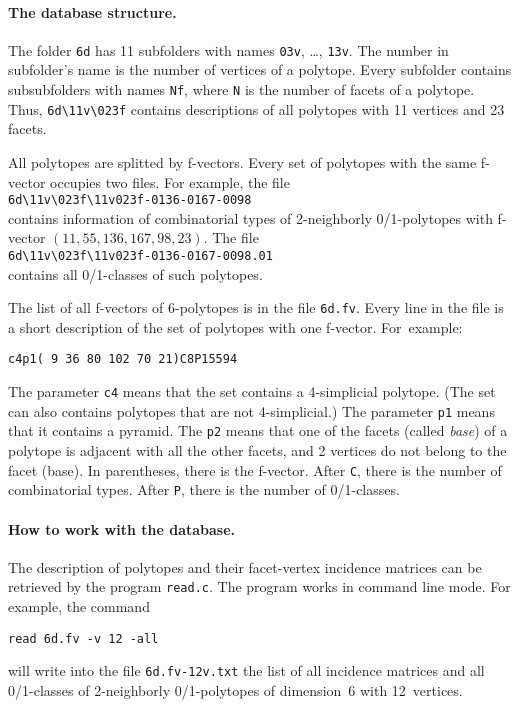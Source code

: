 \documentclass[12pt]{article}
\begin{document}
\paragraph{The database structure.}
The folder \texttt{6d} has 11 subfolders with names \texttt{03v}, \dots, \texttt{13v}.
The number in subfolder's name is the number of vertices of a polytope.
Every subfolder contains subsubfolders with names \texttt{Nf}, where \texttt{N} is the number of facets of a polytope.
Thus, \texttt{6d\textbackslash11v\textbackslash023f} contains descriptions of all polytopes with 11 vertices and 23 facets.

All polytopes are splitted by f-vectors.
Every set of polytopes with the same f-vector occupies two files.
For example, the file\\
 \texttt{6d\textbackslash11v\textbackslash023f\textbackslash11v023f-0136-0167-0098}\\
contains information of combinatorial types of 2-neighborly 0/1-polytopes with f-vector $(11, 55, 136, 167, 98, 23)$.
The file \\
\texttt{6d\textbackslash11v\textbackslash023f\textbackslash11v023f-0136-0167-0098.01}\\
contains all 0/1-classes of such polytopes.

The list of all f-vectors of 6-polytopes is in the file \texttt{6d.fv}.
Every line in the file is a short description of the set of polytopes with one f-vector.
For~example:\\
\centerline{\texttt{c4p1( 9 36 80 102 70 21)C8P15594}}
The parameter \texttt{c4} means that the set contains a 4-simplicial polytope.
(The set can also contains polytopes that are not 4-simplicial.)
The parameter \texttt{p1} means that it contains a pyramid.
The \texttt{p2} means that one of the facets (called \emph{base}) of a polytope is adjacent with all the other facets, and 2 vertices do not belong to the facet (base).
In parentheses, there is the f-vector.
After \texttt{C}, there is the number of combinatorial types.
After \texttt{P}, there is the number of 0/1-classes.

\paragraph{How to work with the database.}
The description of polytopes and their facet-vertex incidence matrices can be retrieved by the program \texttt{read.c}. The program works in command line mode. For example, the command\\
\centerline{\texttt{read 6d.fv -v 12 -all}}
will write into the file \texttt{6d.fv-12v.txt} the list of all incidence matrices and all 0/1-classes of 2-neighborly 0/1-polytopes of dimension~6 with 12~vertices.
\end{document}
